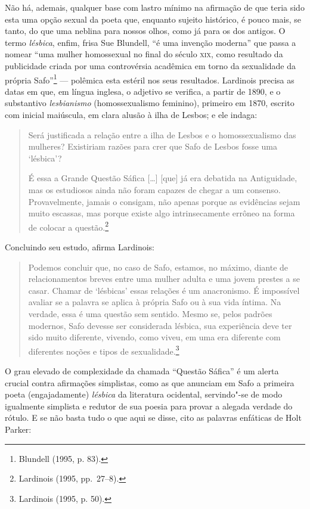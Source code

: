 \noindent{}Não há,
ademais, qualquer base com lastro mínimo na afirmação de que teria sido esta
uma opção sexual da poeta que, enquanto sujeito histórico, é pouco mais, se
tanto, do que uma neblina para nossos olhos, como já para os dos antigos. O
termo \textit{lésbica}, enfim, frisa Sue Blundell, “é uma
invenção moderna” que passa a nomear “uma mulher homossexual no final do século
\textsc{xix}, como resultado da publicidade criada por uma controvérsia acadêmica em
torno da sexualidade da própria Safo”\footnote{ Blundell (1995, p. 83).} --- polêmica esta 
estéril nos seus resultados.
Lardinois precisa as datas em que, em
língua inglesa, o adjetivo se verifica, a partir de 1890, e o substantivo
\textit{lesbianismo} (homossexualismo feminino), primeiro em 1870, escrito com
inicial maiúscula, em clara alusão à ilha de Lesbos; e ele indaga:

\begin{quote}
Será justificada a relação entre a ilha de Lesbos e o homossexualismo das
mulheres? Existiriam razões para crer que Safo de Lesbos fosse uma ‘lésbica’?

É essa a Grande Questão Sáfica [\ldots{}] [que] já era debatida na Antiguidade, mas
os estudiosos ainda não foram capazes de chegar a um consenso. Provavelmente,
jamais o consigam, não apenas porque as evidências sejam muito escassas, mas
porque existe algo intrinsecamente errôneo na forma de colocar a questão.\footnote{ Lardinois (1995, pp.~27--8).}
\end{quote}

Concluindo seu estudo, afirma Lardinois:

\begin{quote}
Podemos concluir que, no caso de Safo, estamos, no máximo, diante de
relacionamentos breves entre uma mulher adulta e uma jovem prestes a se casar.
Chamar de ‘lésbicas’ essas relações é um anacronismo. É impossível avaliar se a
palavra se aplica à própria Safo ou à sua vida íntima. Na verdade, essa é uma
questão sem sentido. Mesmo se, pelos padrões modernos, Safo devesse ser
considerada lésbica, sua experiência deve ter sido muito diferente, vivendo,
como viveu, em uma era diferente com diferentes noções e tipos de sexualidade.\footnote{ Lardinois (1995, p. 50).}
\end{quote}

O grau elevado de complexidade da chamada “Questão Sáfica” é um alerta
crucial contra afirmações simplistas, como as que anunciam em Safo a
primeira poeta (engajadamente) \textit{lésbica} da literatura ocidental,
servindo"-se de modo igualmente simplista e redutor de sua poesia para provar a alegada
verdade do rótulo. E se não basta tudo o que aqui se disse, cito as palavras
enfáticas de Holt Parker: 

